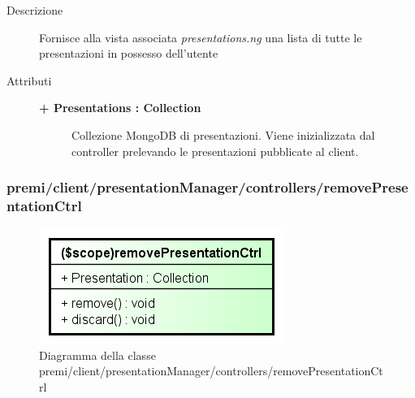 \begin{description}
\item[Descrizione] \hfill
	Fornisce alla vista associata \textit{presentations.ng} una lista di tutte le presentazioni in possesso dell'utente
	
	
\item[Attributi] \hfill
	\begin{description}
		\item[\textbf{+ Presentations : Collection			}] \hfill
			Collezione MongoDB di presentazioni. Viene inizializzata dal controller prelevando le presentazioni pubblicate al client.
	\end{description}

\end{description}





\subsubsection{premi/client/presentationManager/controllers/removePresentationCtrl}
\begin{figure}[h]
\begin{center}
\includegraphics[scale=0.90]{img/diacla/removePresentationCtrl.png}
\caption{Diagramma della classe premi/client/presentationManager/controllers/removePresentationCtrl}
\end{center}
\end{figure}




